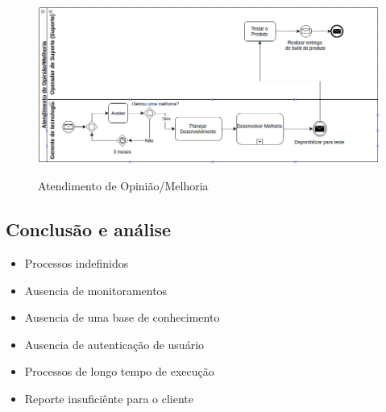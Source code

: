 \begin{figure}[!h]
\caption{Atendimento de Opinião/Melhoria}
\centering %
\includegraphics[width=15cm]{as-is/04_atendimento_de_melhoria.png}
\label{figura:atendimento_de_melhoria_as_is}
\end{figure}

\subsection{Conclusão e análise}
\begin{itemize}[noitemsep]
  \item Processos indefinidos
  \item Ausencia de monitoramentos
  \item Ausencia de uma base de conhecimento
  \item Ausencia de autenticação de usuário
  \item Processos de longo tempo de execução
  \item Reporte insuficiênte para o cliente
\end{itemize}
